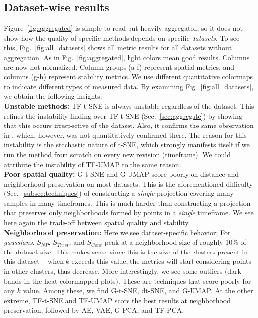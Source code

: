 \subsection{Dataset-wise results}
%
Figure~\ref{fig:aggregated} is simple to read but heavily aggregated, so it does not show how the quality of specific methods depends on specific \emph{datasets}. To see this, Fig.~\ref{fig:all_datasets} shows all metric results for all datasets without aggregation. As in Fig.~\ref{fig:aggregated}, light colors mean good results. Columns are now not normalized. Column groups (a-f) represent spatial metrics, and columns (g-h) represent stability metrics. We use different quantitative colormaps to indicate different types of measured data. By examining Fig.~\ref{fig:all_datasets}, we obtain the following insights:\\

\noindent\textbf{Unstable methods:}  TF-t-SNE is always unstable regardless of the dataset. This refines the instability finding over TF-t-SNE (Sec.~\ref{sec:aggregate}) by showing that this occurs irrespective of the dataset. Also, it confirms the same observation in \cite{Rauber2016}, which, however, was not quantitatively confirmed there. The reason for this instability is the stochastic nature of t-SNE, which strongly manifests itself if we run the method from scratch on every new revision (timeframe). We could attribute the instability of TF-UMAP to the same reason.\\

\noindent\textbf{Poor spatial quality:} G-t-SNE and G-UMAP score poorly on distance and neighborhood preservation on most datasets. This is the aforementioned difficulty (Sec.~\ref{subsec:techniques}) of constructing a \emph{single} projection covering many samples in many timeframes. This is much harder than constructing a projection that preserves only neighborhoods formed by points in a \emph{single} timeframe. We see here again the trade-off between spatial quality and stability.\\

\noindent\textbf{Neighborhood preservation:}
Here we see dataset-specific behavior: For \emph{gaussians}, $S_{NP}$, $S_{Trust}$, and $S_{Cont}$ peak at a neighborhood size of roughly 10\% of the dataset size. This makes sense since this is the size of the clusters present in this dataset -- when $k$ exceeds this value, the metrics will start considering points in other clusters, thus decrease. More interestingly, we see some outliers (dark bands in the heat-colormapped plots). These are techniques that score poorly for any $k$ value. Among these, we find G-t-SNE, dt-SNE, and G-UMAP. At the other extreme, TF-t-SNE and TF-UMAP score the best results at neighborhood preservation, followed by AE, VAE, G-PCA, and TF-PCA.\\


